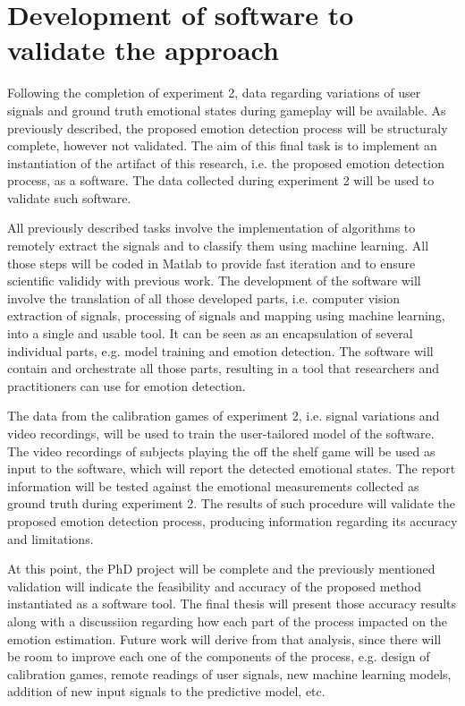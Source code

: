 \section{Development of software to validate the approach}
\label{closing:development-software}

Following the completion of experiment 2, data regarding variations of user signals and ground truth emotional states during gameplay will be available. As previously described, the proposed emotion detection process will be structuraly complete, however not validated. The aim of this final task is to implement an instantiation of the artifact of this research, i.e. the proposed emotion detection process, as a software. The data collected during experiment 2 will be used to validate such software.

All previously described tasks involve the implementation of algorithms to remotely extract the signals and to classify them using machine learning. All those steps will be coded in Matlab to provide fast iteration and to ensure scientific valididy with previous work. The development of the software will involve the translation of all those developed parts, i.e. computer vision extraction of signals, processing of signals and mapping using machine learning, into a single and usable tool. It can be seen as an encapsulation of several individual parts, e.g. model training and emotion detection. The software will contain and orchestrate all those parts, resulting in a tool that researchers and practitioners can use for emotion detection.

The data from the calibration games of experiment 2, i.e. signal variations and video recordings, will be used to train the user-tailored model of the software. The video recordings of subjects playing the off the shelf game will be used as input to the software, which will report the detected emotional states. The report information will be tested against the emotional measurements collected as ground truth during experiment 2. The results of such procedure will validate the proposed emotion detection process, producing information regarding its accuracy and limitations.

At this point, the PhD project will be complete and the previously mentioned validation will indicate the feasibility and accuracy of the proposed method instantiated as a software tool. The final thesis will present those accuracy results along with a discussiion regarding how each part of the process impacted on the emotion estimation. Future work will derive from that analysis, since there will be room to improve each one of the components of the process, e.g. design of calibration games, remote readings of user signals, new machine learning models, addition of new input signals to the predictive model, etc.

